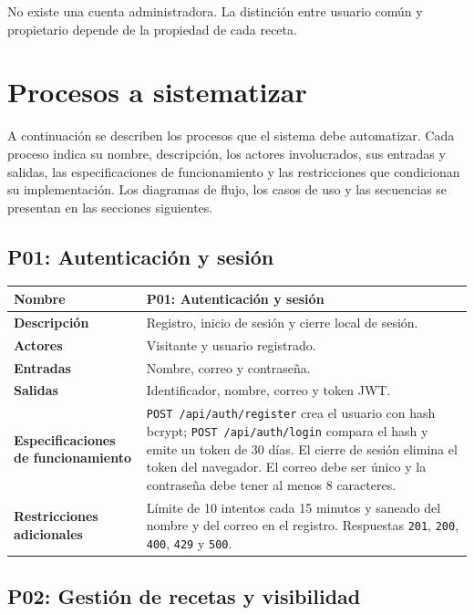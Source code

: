 \documentclass[doc,12pt,a4paper]{apa7}
\begin{document}
No existe una cuenta administradora. La distinción entre usuario común y propietario depende de la propiedad de cada receta.

\section{Procesos a sistematizar}

A continuación se describen los procesos que el sistema debe automatizar. Cada proceso indica su nombre, descripción, los actores involucrados, sus entradas y salidas, las especificaciones de funcionamiento y las restricciones que condicionan su implementación. Los diagramas de flujo, los casos de uso y las secuencias se presentan en las secciones siguientes.

\subsection{P01: Autenticación y sesión}

\begin{longtable}{|P{3.3cm}|L{11.2cm}|}
\hline
\textbf{Nombre} & P01: Autenticación y sesión \\ \hline
\textbf{Descripción} & Registro, inicio de sesión y cierre local de sesión. \\ \hline
\textbf{Actores} & Visitante y usuario registrado. \\ \hline
\textbf{Entradas} & Nombre, correo y contraseña. \\ \hline
\textbf{Salidas} & Identificador, nombre, correo y token JWT. \\ \hline
\textbf{Especificaciones de funcionamiento} & \texttt{POST /api/auth/register} crea el usuario con hash bcrypt; \texttt{POST /api/auth/login} compara el hash y emite un token de 30 días. El cierre de sesión elimina el token del navegador. El correo debe ser único y la contraseña debe tener al menos 8 caracteres. \\ \hline
\textbf{Restricciones adicionales} & Límite de 10 intentos cada 15 minutos y saneado del nombre y del correo en el registro. Respuestas \texttt{201}, \texttt{200}, \texttt{400}, \texttt{429} y \texttt{500}. \\ \hline
\end{longtable}

\subsection{P02: Gestión de recetas y visibilidad}
\end{document}
